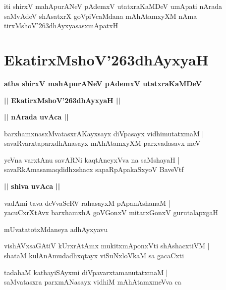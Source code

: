 \documentclass[twoside,12pt,openright]{book}
\def\S{\char'263}
\newcounter{shloka}[chapter]
\def\uvaca#1{\centerline{{\large\textbf{#1}}}}
\begin{document}
\begin{center}
iti shirxV mahApurANeV pAdemxV utatxraKaMDeV umApati nArada saMvAdeV  
shAsatxrX goVpiVcaMdana mAhAtamxyXM nAma tirxMshoV\S dhAyxyasasxmApatxH
\end{center}

\chapter{EkatirxMshoV\S dhAyxyaH}

\begin{center}
{\LARGE\bfseries atha shirxV mahApurANeV pAdemxV utatxraKaMDeV}
\end{center}

\begin{center}
{\LARGE\bfseries || EkatirxMshoV\S dhAyxyaH ||}
\end{center}

\uvaca{|| nArada uvAca ||}

\begin{shloka}%
barxhamxnasxMvatasxrAKayxsayx diVpasayx vidhimutatxmaM |\\
savaRvarxtaparxdhAnasayx mAhAtamxyXM parxvadasavx meV
\end{shloka}

\begin{shloka}%
yeVna varxtAnu savARNi kaqtAneyxVva na saMshayaH |\\
savaRkAmasamaqdidhxshacx sapaRpApakaSxyoV BaveVtf
\end{shloka}

\uvaca{|| shiva uvAca ||}

\begin{shloka}%
vadAmi tava deVvaSeRV rahasayxM pApanAshanaM |\\
yacuCxrXtAvx barxhamxhA goVGonxV mitarxGonxV gurutalapxgaH 
\end{shloka}

\begin{center}
mUvatatotxMdaneya adhAyxyavu
\end{center}

\begin{shloka}%
vishAVxsaGAtiV kUrxrAtAmx mukitxmAponxVti shAshacxtiVM |\\
shataM kulAnAmudadhxqtayx viSuNxloVkaM sa gacaCxti
\end{shloka}

\begin{shloka}%
tadahaM kathayiSAyxmi diVpavarxtamanutatxmaM |\\
saMvatasxra parxmANasayx vidhiM mAhAtamxmeVva ca 
\end{shloka}
\end{document}
